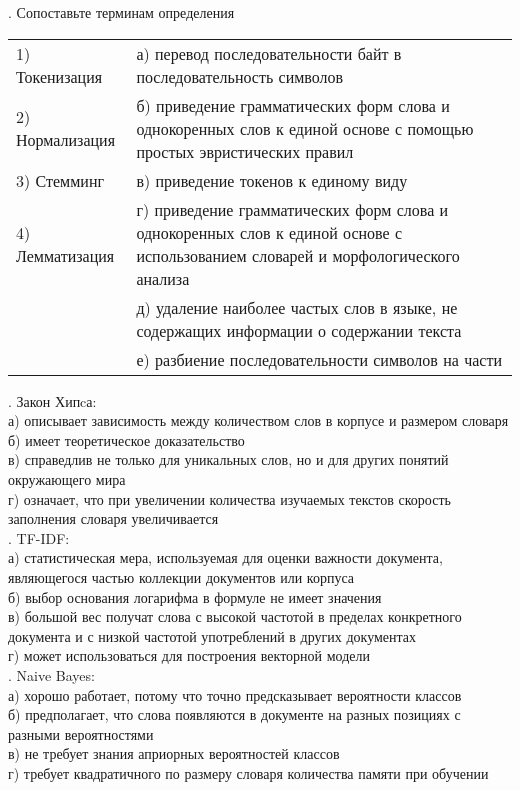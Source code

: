 \documentclass[10pt,a4paper]{article}
\author{Nikolay Anokhin}
\begin{document}
\thispagestyle{empty}

. Сопоставьте терминам определения \\

\begin{tabular}{l p{12cm}}
1) Токенизация & а) перевод последовательности байт в последовательность символов \\
2) Нормализация &  б) приведение грамматических форм слова и однокоренных слов к единой основе с помощью простых эвристических правил \\
3) Стемминг  & в) приведение токенов к единому виду \\
4) Лемматизация & г) приведение грамматических форм слова и однокоренных слов к единой основе с использованием словарей и морфологического анализа \\
& д) удаление наиболее частых слов в языке, не содержащих информации о содержании текста \\
& е) разбиение последовательности символов на части \\
\end{tabular}
\vspace{1em}

. Закон Хипcа: \\
а) описывает зависимость между количеством слов в корпусе и размером словаря \\
б) имеет теоретическое доказательство \\
в) справедлив не только для уникальных слов, но и для других понятий окружающего мира \\
г) означает, что при увеличении количества изучаемых текстов скорость заполнения словаря увеличивается \\

. TF-IDF: \\
а) статистическая мера, используемая для оценки важности документа, являющегося частью коллекции документов или корпуса \\
б) выбор основания логарифма в формуле не имеет значения \\
в) большой вес получат слова с высокой частотой в пределах конкретного документа и с низкой частотой употреблений в других документах \\
г) может использоваться для построения векторной модели \\

. Naive Bayes: \\
а) хорошо работает, потому что точно предсказывает вероятности классов \\
б) предполагает, что слова появляются в документе на разных позициях с разными вероятностями \\
в) не требует знания априорных вероятностей классов \\
г) требует квадратичного по размеру словаря количества памяти при обучении\\
\end{document}
